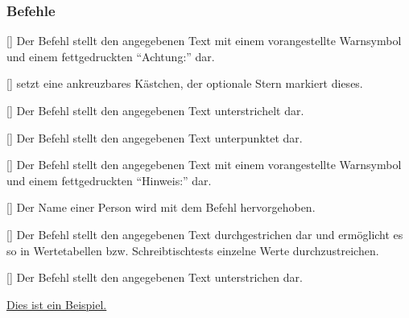 \subsubsection{Befehle}
\begin{commands}
    [] Der Befehl  stellt den angegebenen Text mit einem vorangestellte Warnsymbol und einem fettgedruckten \enquote{Achtung:} dar.
\begin{sidebyside}[gobble=4]
\end{sidebyside}

    [\sarg] setzt eine ankreuzbares Kästchen, der optionale Stern markiert dieses.
\begin{sidebyside}[gobble=4]
    \chb \chb*
\end{sidebyside}

    [] Der Befehl  stellt den angegebenen Text unterstrichelt dar.
\begin{sidebyside}[gobble=4]
\end{sidebyside}

    [] Der Befehl  stellt den angegebenen Text unterpunktet dar.
\begin{sidebyside}[gobble=4]
\end{sidebyside}

    [] Der Befehl  stellt den angegebenen Text mit einem vorangestellte Warnsymbol und einem fettgedruckten \enquote{Hinweis:} dar.
\begin{sidebyside}[gobble=4]
\end{sidebyside}

    [] Der Name einer Person wird mit dem Befehl  hervorgehoben.
\begin{sidebyside}[gobble=4]
\end{sidebyside}

    [] Der Befehl  stellt den angegebenen Text durchgestrichen dar und ermöglicht es so in Wertetabellen bzw. Schreibtischtests einzelne Werte durchzustreichen.
\begin{sidebyside}[gobble=4]
\end{sidebyside}

    [] Der Befehl  stellt den angegebenen Text unterstrichen dar.
\begin{sidebyside}[gobble=4]
    \uline{Dies ist ein Beispiel.}
\end{sidebyside}


\end{commands}
